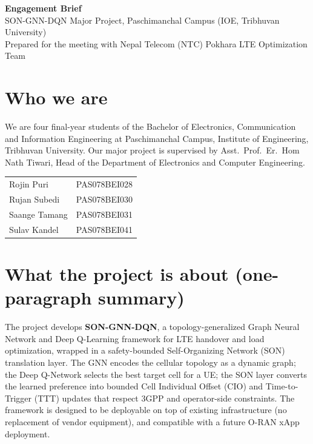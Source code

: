 \documentclass[11pt,a4paper]{article}
\begin{document}
\begin{center}
    {\Large\bfseries Engagement Brief}\\[0.2cm]
    {\large SON-GNN-DQN Major Project, Paschimanchal Campus (IOE,
    Tribhuvan University)}\\[0.2cm]
    {\small Prepared for the meeting with Nepal Telecom (NTC) Pokhara
    LTE Optimization Team}
\end{center}

\section{Who we are}

We are four final-year students of the Bachelor of Electronics,
Communication and Information Engineering at Paschimanchal Campus,
Institute of Engineering, Tribhuvan University. Our major project is
supervised by Asst.\ Prof.\ Er.\ Hom Nath Tiwari, Head of the Department
of Electronics and Computer Engineering.

\begin{center}
\begin{tabular}{ll}
Rojin Puri      & PAS078BEI028 \\
Rujan Subedi    & PAS078BEI030 \\
Saange Tamang   & PAS078BEI031 \\
Sulav Kandel    & PAS078BEI041 \\
\end{tabular}
\end{center}

\section{What the project is about (one-paragraph summary)}

The project develops \textbf{SON-GNN-DQN}, a topology-generalized Graph
Neural Network and Deep Q-Learning framework for LTE handover and load
optimization, wrapped in a safety-bounded Self-Organizing Network (SON)
translation layer. The GNN encodes the cellular topology as a dynamic
graph; the Deep Q-Network selects the best target cell for a UE; the
SON layer converts the learned preference into bounded Cell Individual
Offset (CIO) and Time-to-Trigger (TTT) updates that respect 3GPP and
operator-side constraints. The framework is designed to be deployable
on top of existing infrastructure (no replacement of vendor equipment),
and compatible with a future O-RAN xApp deployment.
\end{document}
